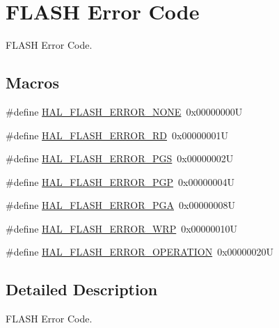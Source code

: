 \hypertarget{group___f_l_a_s_h___error___code}{}\section{F\+L\+A\+SH Error Code}
\label{group___f_l_a_s_h___error___code}


F\+L\+A\+SH Error Code.  


\subsection*{Macros}
\begin{DoxyCompactItemize}
\item 
\#define \mbox{\hyperlink{group___f_l_a_s_h___error___code_gae7fb9ee7198d393aba27ade3a9f50a70}{H\+A\+L\+\_\+\+F\+L\+A\+S\+H\+\_\+\+E\+R\+R\+O\+R\+\_\+\+N\+O\+NE}}~0x00000000U
\item 
\#define \mbox{\hyperlink{group___f_l_a_s_h___error___code_ga33008f2ad5085cd4158dd260fb2d124d}{H\+A\+L\+\_\+\+F\+L\+A\+S\+H\+\_\+\+E\+R\+R\+O\+R\+\_\+\+RD}}~0x00000001U
\item 
\#define \mbox{\hyperlink{group___f_l_a_s_h___error___code_ga7132ff3b7f45c0cfe818d61bdb01dc64}{H\+A\+L\+\_\+\+F\+L\+A\+S\+H\+\_\+\+E\+R\+R\+O\+R\+\_\+\+P\+GS}}~0x00000002U
\item 
\#define \mbox{\hyperlink{group___f_l_a_s_h___error___code_ga4c79d30899d81069a5a7d36c9a008114}{H\+A\+L\+\_\+\+F\+L\+A\+S\+H\+\_\+\+E\+R\+R\+O\+R\+\_\+\+P\+GP}}~0x00000004U
\item 
\#define \mbox{\hyperlink{group___f_l_a_s_h___error___code_gad9f62b6567543610f667bce580550662}{H\+A\+L\+\_\+\+F\+L\+A\+S\+H\+\_\+\+E\+R\+R\+O\+R\+\_\+\+P\+GA}}~0x00000008U
\item 
\#define \mbox{\hyperlink{group___f_l_a_s_h___error___code_ga27e871d85f9311272098315bc3723075}{H\+A\+L\+\_\+\+F\+L\+A\+S\+H\+\_\+\+E\+R\+R\+O\+R\+\_\+\+W\+RP}}~0x00000010U
\item 
\#define \mbox{\hyperlink{group___f_l_a_s_h___error___code_gafa1433e0ca2366478928c04244310d44}{H\+A\+L\+\_\+\+F\+L\+A\+S\+H\+\_\+\+E\+R\+R\+O\+R\+\_\+\+O\+P\+E\+R\+A\+T\+I\+ON}}~0x00000020U
\end{DoxyCompactItemize}


\subsection{Detailed Description}
F\+L\+A\+SH Error Code. 



